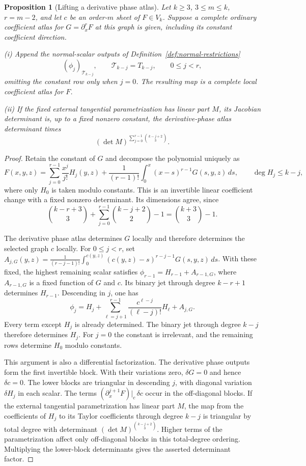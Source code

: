 \documentclass[11pt]{amsart}
\newtheorem{proposition}[theorem]{Proposition}
\theoremstyle{definition}
\theoremstyle{remark}
\numberwithin{equation}{section}
\begin{document}
\begin{proposition}[Lifting a derivative phase atlas]\label{low:78:smult:atlas}
Let $k\ge3$, $3\le m\le k$, $r=m-2$, and let $c$ be an order-$m$ sheet of $F\in V_k$. Suppose a complete ordinary coefficient atlas for $G=\partial_x^rF$ at this graph is given, including its constant coefficient direction.

\noindent\textup{(i)} Append the normal-scalar outputs of Definition~\ref{def:normal-restrictions}
\[
(\phi_j)_{\mathcal T_{k-j}},\qquad \mathcal T_{k-j}=T_{k-j},\qquad 0\le j<r,
\]
omitting the constant row only when $j=0$. The resulting map is a complete local coefficient atlas for $F$.

\noindent\textup{(ii)} If the fixed external tangential parametrization has linear part $M$, its Jacobian determinant is, up to a fixed nonzero constant, the derivative-phase atlas determinant times
\[
(\det M)^{\sum_{j=0}^{r-1}\binom{k-j+2}{3}}.
\]
\end{proposition}
\begin{proof}
Retain the constant of $G$ and decompose the polynomial uniquely as
\[
F(x,y,z)=\sum_{j=0}^{r-1}\frac{x^j}{j!}H_j(y,z)
+\frac{1}{(r-1)!}\int_0^x(x-s)^{r-1}G(s,y,z)\,ds,
\qquad \deg H_j\le k-j,
\]
where only $H_0$ is taken modulo constants. This is an invertible linear coefficient change with a fixed nonzero determinant. Its dimensions agree, since
\[
\binom{k-r+3}{3}
+\sum_{j=0}^{r-1}\binom{k-j+2}{2}-1
=\binom{k+3}{3}-1.
\]

The derivative phase atlas determines $G$ locally and therefore determines the selected graph $c$ locally. For $0\le j<r$, set $A_{j,G}(y,z)=\frac1{(r-j-1)!}\int_0^{c(y,z)}(c(y,z)-s)^{r-j-1}G(s,y,z)\,ds$. With these fixed, the highest remaining scalar satisfies $\phi_{r-1}=H_{r-1}+A_{r-1,G}$, where $A_{r-1,G}$ is a fixed function of $G$ and $c$. Its binary jet through degree $k-r+1$ determines $H_{r-1}$. Descending in $j$, one has
\[
\phi_j=H_j+\sum_{\ell=j+1}^{r-1}\frac{c^{\ell-j}}{(\ell-j)!}H_\ell+A_{j,G}.
\]
Every term except $H_j$ is already determined. The binary jet through degree $k-j$ therefore determines $H_j$. For $j=0$ the constant is irrelevant, and the remaining rows determine $H_0$ modulo constants.

This argument is also a differential factorization. The derivative phase outputs form the first invertible block. With their variations zero, $\delta G=0$ and hence $\delta c=0$. The lower blocks are triangular in descending $j$, with diagonal variation $\delta H_j$ in each scalar. The terms $(\partial_x^{j+1}F)|_c\,\delta c$ occur in the off-diagonal blocks. If the external tangential parametrization has linear part $M$, the map from the coefficients of $H_j$ to its Taylor coefficients through degree $k-j$ is triangular by total degree with determinant $(\det M)^{\binom{k-j+2}{3}}$. Higher terms of the parametrization affect only off-diagonal blocks in this total-degree ordering. Multiplying the lower-block determinants gives the asserted determinant factor.
\end{proof}
\end{document}
